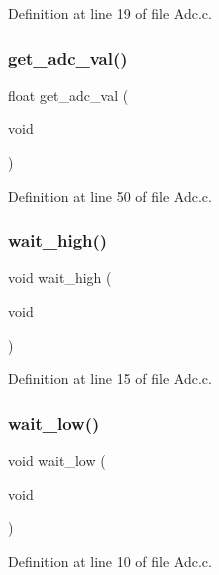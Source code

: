 Definition at line 19 of file Adc.\+c.

\mbox{\label{_adc_8c_ad7adec982039e6bbf58fd9ac980cbce1}} 
\subsubsection{get\+\_\+adc\+\_\+val()}
{\footnotesize\ttfamily float get\+\_\+adc\+\_\+val (\begin{DoxyParamCaption}\item[{void}]{ }\end{DoxyParamCaption})}



Definition at line 50 of file Adc.\+c.

\mbox{\label{_adc_8c_a74334c3ecd0c41da36dc5c5f4dfb06d9}} 
\subsubsection{wait\+\_\+high()}
{\footnotesize\ttfamily void wait\+\_\+high (\begin{DoxyParamCaption}\item[{void}]{ }\end{DoxyParamCaption})}



Definition at line 15 of file Adc.\+c.

\mbox{\label{_adc_8c_a7502fb5731fafddcb09019ee3b62e521}} 
\subsubsection{wait\+\_\+low()}
{\footnotesize\ttfamily void wait\+\_\+low (\begin{DoxyParamCaption}\item[{void}]{ }\end{DoxyParamCaption})}



Definition at line 10 of file Adc.\+c.

